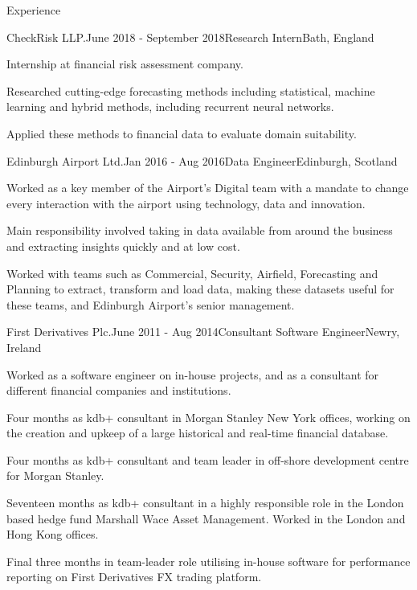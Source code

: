 \documentclass{resume} %
\begin{document}
\begin{rSection}{Experience}
  \begin{rSubsection}{CheckRisk LLP.}{June 2018 - September 2018}{Research Intern}{Bath, England}
    \item Internship at financial risk assessment company.
    \item Researched cutting-edge forecasting methods including statistical, machine learning and hybrid methods, including recurrent neural networks.
    \item Applied these methods to financial data to evaluate domain suitability.
  \end{rSubsection}

  \begin{rSubsection}{Edinburgh Airport Ltd.}{Jan 2016 - Aug 2016}{Data Engineer}{Edinburgh, Scotland}
    \item Worked as a key member of the Airport's Digital team with a mandate to change every interaction with the airport using technology, data and innovation.
    \item Main responsibility involved taking in data available from around the business and extracting insights quickly and at low cost.
    \item Worked with teams such as Commercial, Security, Airfield, Forecasting and Planning to extract, transform and load data, making these datasets useful for these teams, and Edinburgh Airport’s senior management.
  \end{rSubsection}

  \begin{rSubsection}{First Derivatives Plc.}{June 2011 - Aug 2014}{Consultant Software Engineer}{Newry, Ireland}
    \item Worked as a software engineer on in-house projects, and as a consultant for different financial companies and institutions.
    \item Four months as kdb+ consultant in Morgan Stanley New York offices, working on the creation and upkeep of a large historical and real-time financial database.
    \item Four months as kdb+ consultant and team leader in off-shore development centre for Morgan Stanley.
    \item Seventeen months as kdb+ consultant in a highly responsible role in the London based hedge fund Marshall Wace Asset Management. Worked in the London and Hong Kong offices.
    \item Final three months in team-leader role utilising in-house software for performance reporting on First Derivatives FX trading platform.
  \end{rSubsection}


\end{rSection}
\end{document}
